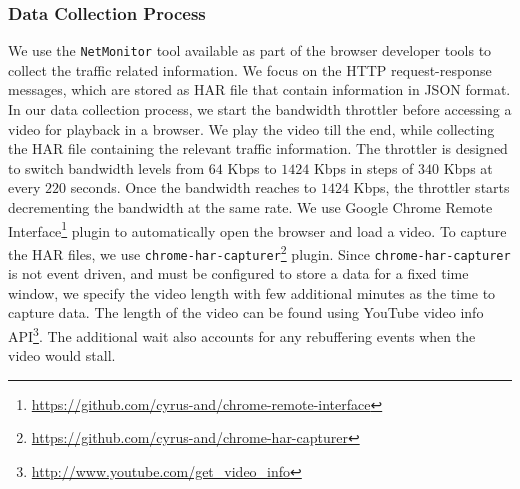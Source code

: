 \subsubsection{Data Collection Process}
We use the {\tt NetMonitor} tool available as part of the browser developer tools to collect the traffic related information.
We focus on the \ac{HTTP} request-response messages, which are stored as \ac{HAR} file that contain information in \ac{JSON} format. In our data collection process, we start the bandwidth throttler before accessing a video for playback in a browser. We play the video till the end, while collecting the \ac{HAR} file containing the relevant traffic information.
The throttler is designed to switch bandwidth levels from $64$ Kbps to $1424$ Kbps in steps of $340$ Kbps at every $220$ seconds. Once the bandwidth reaches to $1424$ Kbps, the throttler starts decrementing the bandwidth at the same rate. 
We use Google Chrome Remote Interface\footnote{\url{https://github.com/cyrus-and/chrome-remote-interface}} plugin to automatically open the browser and load a video.
To capture the \ac{HAR} files, we use \texttt{chrome-har-capturer}\footnote{\url{https://github.com/cyrus-and/chrome-har-capturer}} plugin.
Since \texttt{chrome-har-capturer} is not event driven, and must be configured to store a data for a fixed time window, we specify the video length with few additional minutes as the time to capture data. The length of the video can be found using YouTube video info \ac{API}\footnote{\url{http://www.youtube.com/get_video_info}}.
The additional wait also accounts for any rebuffering events when the video would stall.


